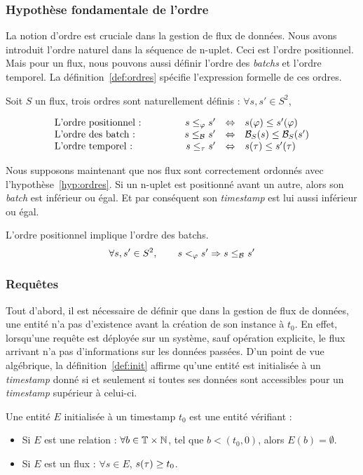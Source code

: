 \subsubsection{Hypothèse fondamentale de l'ordre}
La notion d'ordre est cruciale dans la gestion de flux de données. Nous avons introduit l'ordre naturel dans la séquence de n-uplet. Ceci est l'ordre positionnel. Mais pour un flux, nous pouvons aussi définir l'ordre des \textit{batchs} et l'ordre temporel. La définition~\ref{def:ordres} spécifie l'expression formelle de ces ordres.
\begin{defi}\label{def:ordres}
Soit $S$ un flux, trois ordres sont naturellement définis : $\forall s,s' \in S^2$,

$$\begin{array}{lcrcl} 
\textrm{L'ordre positionnel : } &\qquad & s \leq_\varphi s' & \Leftrightarrow & s(\varphi) \leq s'(\varphi)\\
\textrm{L'ordre des batch : } & & s \leq_{\mathcal{B}_{}} s' &\Leftrightarrow& \mathcal{B}_S(s) \leq \mathcal{B}_S(s')\\
\textrm{L'ordre temporel : } & & s \leq_\tau s' &\Leftrightarrow& s(\tau) \leq s'(\tau)\\
\end{array}$$
\end{defi}

Nous supposons maintenant que nos flux sont correctement ordonnés avec l'hypothèse~\ref{hyp:ordres}. Si un n-uplet est positionné avant un autre, alors son \textit{batch} est inférieur ou égal. Et par conséquent son \textit{timestamp} est lui aussi inférieur ou égal.
\begin{hyp}\label{hyp:ordres}
L'ordre positionnel implique l'ordre des batchs.
$$\forall s, s'\in S^2, \qquad s <_\varphi s' \Rightarrow s \leq_{\mathcal{B}_{}} s'$$
\end{hyp}

\subsubsection{Requêtes}
Tout d'abord, il est nécessaire de définir que dans la gestion de flux de données, une entité n'a pas d'existence avant la création de son instance à $t_0$. En effet, lorsqu'une requête est déployée sur un système, sauf opération explicite, le flux arrivant n'a pas d'informations sur les données passées. D'un point de vue algébrique, la définition~\ref{def:init} affirme qu'une entité est initialisée à un \textit{timestamp} donné si et seulement si toutes ses données sont accessibles pour un \textit{timestamp} supérieur à celui-ci.
\begin{defi}\label{def:init}
	Une entité $E$ initialisée à un timestamp $t_0$ est une entité vérifiant :
	\begin{itemize}
		\item Si $E$ est une relation : $\forall b \in \mathbb{T}\times\mathbb{N}$, tel que $b<(t_0,0)$, alors $E(b) = \emptyset$.
		\item Si $E$ est un flux : $\forall s\in E$, $s(\tau) \geq t_0$.
	\end{itemize}
\end{defi}

